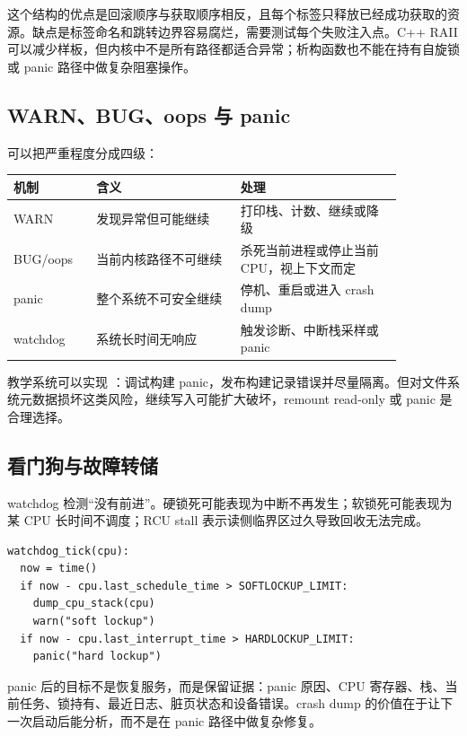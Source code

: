 这个结构的优点是回滚顺序与获取顺序相反，且每个标签只释放已经成功获取的资源。缺点是标签命名和跳转边界容易腐烂，需要测试每个失败注入点。C++ RAII 可以减少样板，但内核中不是所有路径都适合异常；析构函数也不能在持有自旋锁或 panic 路径中做复杂阻塞操作。

\subsection{WARN、BUG、oops 与 panic}

可以把严重程度分成四级：

\begin{longtable}{|p{0.18\linewidth}|p{0.32\linewidth}|p{0.36\linewidth}|}
\toprule
机制 & 含义 & 处理 \\
\midrule
WARN & 发现异常但可能继续 & 打印栈、计数、继续或降级 \\\tablerowrule
BUG/oops & 当前内核路径不可继续 & 杀死当前进程或停止当前 CPU，视上下文而定 \\\tablerowrule
panic & 整个系统不可安全继续 & 停机、重启或进入 crash dump \\\tablerowrule
watchdog & 系统长时间无响应 & 触发诊断、中断栈采样或 panic \\
\bottomrule
\end{longtable}

教学系统可以实现 ：调试构建 panic，发布构建记录错误并尽量隔离。但对文件系统元数据损坏这类风险，继续写入可能扩大破坏，remount read-only 或 panic 是合理选择。

\subsection{看门狗与故障转储}

watchdog 检测“没有前进”。硬锁死可能表现为中断不再发生；软锁死可能表现为某 CPU 长时间不调度；RCU stall 表示读侧临界区过久导致回收无法完成。

\begin{lstlisting}
watchdog_tick(cpu):
  now = time()
  if now - cpu.last_schedule_time > SOFTLOCKUP_LIMIT:
    dump_cpu_stack(cpu)
    warn("soft lockup")
  if now - cpu.last_interrupt_time > HARDLOCKUP_LIMIT:
    panic("hard lockup")
\end{lstlisting}

panic 后的目标不是恢复服务，而是保留证据：panic 原因、CPU 寄存器、栈、当前任务、锁持有、最近日志、脏页状态和设备错误。crash dump 的价值在于让下一次启动后能分析，而不是在 panic 路径中做复杂修复。

